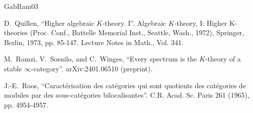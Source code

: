 \documentclass[11pt,leqno]{amsart}
\numberwithin{equation}{section}
\begin{document}
\begin{thebibliography}{GabRam03}




 D.~Quillen, ``Higher algebraic $K$-theory. I''. Algebraic $K$-theory, I: Higher K-theories
(Proc. Conf., Battelle Memorial Inst., Seattle, Wash., 1972), Springer, Berlin, 1973,
pp. 85-147. Lecture Notes in Math., Vol. 341.




 M.~Ramzi, V.~Sosnilo, and C.~Winges, ``Every spectrum is the $K$-theory of a stable $\infty$-category''. arXiv:2401.06510 (preprint).



J.-E.~Roos, ``Caract\'erisation des cat\'egories qui sont quotients des cat\'egories de modules
par des sous-cat\'egories bilocalisantes''. C.R. Acad. Sc. Paris 261 (1965), pp. 4954-4957.




\end{thebibliography}
\end{document}
